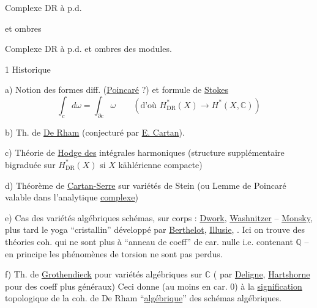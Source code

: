 Complexe DR à p.d.

et ombres

Complexe DR à p.d. et ombres des modules.


1 Historique

a) Notion des formes diff. (\uline{Poincaré} ?) et formule de \uline{Stokes}
\[
\int_c d\omega=\int_{\partial c}\omega
\qquad(\text{d'où }H^*_{\mathrm{DR}}(X)\longrightarrow H^*(X,\mathbb C))
\]

b) Th. de \uline{De Rham} (conjecturé par \uline{E. Cartan}). 

c) Théorie de \uline{Hodge des} intégrales harmoniques
(structure supplémentaire bigraduée sur $H^*_{\mathrm{DR}}(X)$ si $X$ kählérienne compacte)

d) Théorème de \uline{Cartan-Serre} sur variétés de Stein
(ou Lemme de Poincaré valable dans l'analytique \uline{complexe})

e) Cas des variétés algébriques  schémas, sur corps  : \uline{Dwork}, \uline{Washnitzer} -- \uline{Monsky}, plus tard le yoga ``cristallin'' développé par \uline{Berthelot}, \uline{Illusie},   .  Ici on trouve des théories coh. qui ne sont plus à ``anneau de coeff'' de car. nulle i.e. contenant $\mathbb Q$ --  en principe les phénomènes de torsion ne sont pas perdus.

f) Th. de \uline{Grothendieck} pour variétés algébriques sur $\mathbb C$ (  par \uline{Deligne}, \uline{Hartshorne} pour des coeff plus généraux) Ceci donne  (au moins en car. 0) à la \uline{signification} topologique de la coh. de De Rham ``\uline{algébrique}'' des schémas algébriques.

